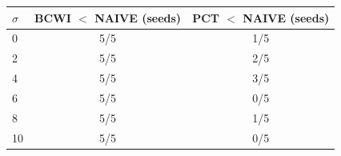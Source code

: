 \begin{tabular}{lcc}
\toprule
$\sigma$ & BCWI $<$ NAIVE (seeds) & PCT $<$ NAIVE (seeds) \\
\midrule
0 & 5/5 & 1/5 \\
2 & 5/5 & 2/5 \\
4 & 5/5 & 3/5 \\
6 & 5/5 & 0/5 \\
8 & 5/5 & 1/5 \\
10 & 5/5 & 0/5 \\
\bottomrule
\end{tabular}